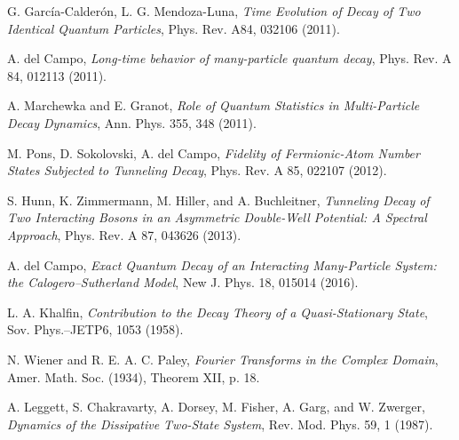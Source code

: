 \documentclass[12pt]{article}
\numberwithin{equation}{section}
\begin{document}
\begin{thebibliography}{}
 G. García-Calderón, L. G. Mendoza-Luna,  {\em Time Evolution of Decay of Two Identical Quantum Particles}, Phys. Rev. A84, 032106 (2011).

 A. del Campo, {\em Long-time behavior of many-particle quantum decay}, Phys. Rev. A 84, 012113 (2011).

 A. Marchewka  and E. Granot, {\em Role of Quantum Statistics in Multi-Particle Decay Dynamics}, Ann. Phys. 355,  348 (2011).



 M. Pons, D. Sokolovski, A. del Campo, {\em Fidelity of Fermionic-Atom Number States Subjected to Tunneling Decay}, Phys. Rev. A 85, 022107 (2012).

S. Hunn, K. Zimmermann, M. Hiller, and A. Buchleitner, {\em
Tunneling Decay of Two Interacting Bosons in an Asymmetric Double-Well Potential: A Spectral Approach}, Phys. Rev. A 87, 043626 (2013).

 A. del Campo, {\em Exact Quantum Decay of an Interacting Many-Particle
System: the Calogero–Sutherland Model}, New J. Phys. 18, 015014 (2016).



 L. A. Khalfin, {\em Contribution to the Decay Theory of a Quasi-Stationary State}, Sov. Phys.–JETP6, 1053 (1958).

 N. Wiener and  R. E. A. C. Paley, {\em Fourier Transforms in the Complex Domain},  Amer. Math. Soc. (1934),  Theorem XII, p. 18.


 A. Leggett, S. Chakravarty, A. Dorsey, M. Fisher, A. Garg, and W. Zwerger, {\em Dynamics of the Dissipative Two-State System}, Rev. Mod. Phys.  59,  1  (1987).
 \end{thebibliography}
\end{document}

